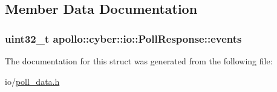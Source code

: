 \subsection{Member Data Documentation}
\hypertarget{structapollo_1_1cyber_1_1io_1_1PollResponse_a9dd5ed052627f12b9b317d5f7e89a525}{
\subsubsection[{events}]{\setlength{\rightskip}{0pt plus 5cm}uint32\-\_\-t apollo\-::cyber\-::io\-::\-Poll\-Response\-::events}}\label{structapollo_1_1cyber_1_1io_1_1PollResponse_a9dd5ed052627f12b9b317d5f7e89a525}


The documentation for this struct was generated from the following file\-:\begin{DoxyCompactItemize}
\item 
io/\hyperlink{poll__data_8h}{poll\-\_\-data.\-h}\end{DoxyCompactItemize}
